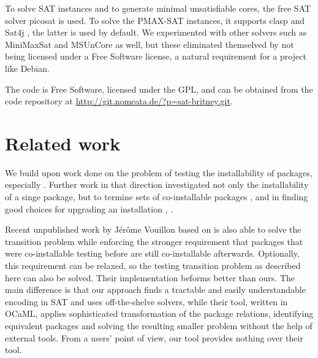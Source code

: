 \documentclass[halfparskip,11pt]{scrartcl}
\begin{document}
To solve SAT instances and to generate minimal unsatisfiable cores, the free SAT solver picosat \cite{picosat} is used. To solve the PMAX-SAT instances, it supports clasp \cite{clasp} and Sat4j \cite{sat4j}, the latter is used by default. We experimented with other solvers such as MiniMaxSat and MSUnCore as well, but these eliminated themselved by not being licensed under a Free Software license, a natural requirement for a project like Debian.


The code is Free Software, licensed under the GPL, and can be obtained from the code repository at \url{http://git.nomeata.de/?p=sat-britney.git}.

\section{Related work}

We build upon work done on the problem of testing the installability of packages, especially \cite{edos}. Further work in that direction investigated not only the installability of a singe package, but to termine sets of co-installable packages \cite{coinst}, and in finding good choices for upgrading an installation \cite{upgrade}, \cite{apt-pbo}.

Recent unpublished work by Jérôme Vouillon based on \cite{coinst} is also able to solve the transition problem while enforcing the stronger requirement that packages that were co-installable testing before are still co-installable afterwards. Optionally, this requirement can be relaxed, so the testing transition problem as described here can also be solved. Their implementation beforms better than ours. The main difference is that our approach finds a tractable and easily understandable encoding in SAT and uses off-the-shelve solvers, while their tool, written in OCaML, applies sophisticated transformation of the package relations, identifying equivalent packages and solving the resulting smaller problem without the help of external tools. From a users' point of view, our tool provides nothing over their tool.

%
%
%
\end{document}

